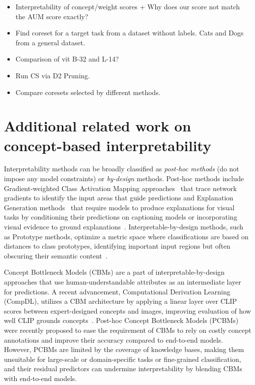 \begin{itemize}
     \item Interpretability of concept/weight scores + Why does our score not match the AUM score exactly?

     \item Find coreset for a target task from a dataset without labels. Cats and Dogs from a general dataset.

     \item Comparison of vit B-32 and L-14?

     \item Run CS via D2 Pruning.

     \item Compare coresets selected by different methods.
     
\end{itemize}
\fi

\section{Additional related work on concept-based interpretability}
\label{App:additional_rw}
Interpretability methods can be broadly classified as \textit{post-hoc methods} (do not impose any model constraints) or \textit{by-design} methods. 
Post-hoc methods include Gradient-weighted Class Activation Mapping approaches~\cite{bau2017network,selvaraju2017grad,mu2020compositional,hernandez2021natural} that trace network gradients to identify the input areas that guide predictions and Explanation Generation methods~\cite{singh2023explaining,nishida2022improving,kim2018textual,hendricks2016generating} that require models to produce explanations for visual tasks by conditioning their predictions on captioning models or incorporating visual evidence to ground explanations~\cite{hendricks2018grounding,park2018multimodal}.
Interpretable-by-design methods, such as Prototype methods, optimize a metric space where classifications are based on distances to class prototypes, identifying important input regions but often obscuring their semantic content~\cite{nauta2021neural,chen2019looks,snell2017prototypical,satorras2018few,vinyals2016matching}. 

Concept Bottleneck Models (CBMs) are a part of interpretable-by-design approaches that use human-understandable attributes as an intermediate layer for predictions.
A recent advancement, Computational Derivation Learning (CompDL), utilizes a CBM architecture by applying a linear layer over CLIP scores between expert-designed concepts and images, improving evaluation of how well CLIP grounds concepts~\cite{yun2022vision}.  
Post-hoc Concept Bottleneck Models (PCBMs) were recently proposed to ease the requirement of CBMs to rely on costly concept annotations and improve their accuracy compared to end-to-end models. 
However, PCBMs are limited by the coverage of knowledge bases, making them unsuitable for large-scale or domain-specific tasks or fine-grained classification, and their residual predictors can undermine interpretability by blending CBMs with end-to-end models.

